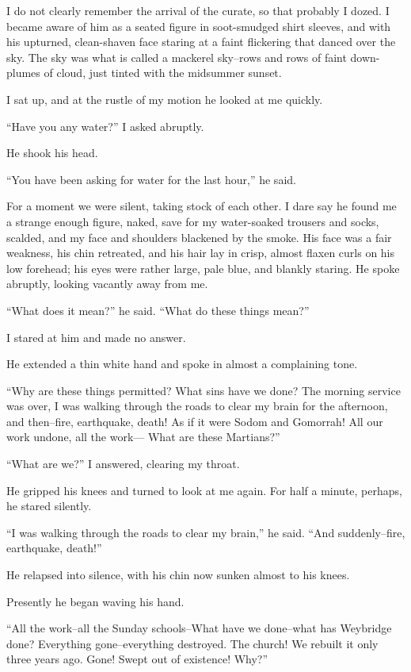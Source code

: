 I do not clearly remember the arrival of the curate, so that
probably I dozed. I became aware of him as a seated figure in
soot-smudged shirt sleeves, and with his upturned, clean-shaven
face staring at a faint flickering that danced over the sky. The
sky was what is called a mackerel sky--rows and rows of faint
down-plumes of cloud, just tinted with the midsummer sunset.

I sat up, and at the rustle of my motion he looked at me quickly.

``Have you any water?'' I asked abruptly.

He shook his head.

``You have been asking for water for the last hour,'' he said.

For a moment we were silent, taking stock of each other. I dare say
he found me a strange enough figure, naked, save for my
water-soaked trousers and socks, scalded, and my face and shoulders
blackened by the smoke. His face was a fair weakness, his chin
retreated, and his hair lay in crisp, almost flaxen curls on his
low forehead; his eyes were rather large, pale blue, and blankly
staring. He spoke abruptly, looking vacantly away from me.

``What does it mean?'' he said. ``What do these things mean?''

I stared at him and made no answer.

He extended a thin white hand and spoke in almost a complaining
tone.

``Why are these things permitted? What sins have we done? The
morning service was over, I was walking through the roads to clear
my brain for the afternoon, and then--fire, earthquake, death! As
if it were Sodom and Gomorrah! All our work undone, all the
work--- What are these Martians?''

``What are we?'' I answered, clearing my throat.

He gripped his knees and turned to look at me again. For half a
minute, perhaps, he stared silently.

``I was walking through the roads to clear my brain,'' he said. ``And
suddenly--fire, earthquake, death!''

He relapsed into silence, with his chin now sunken almost to his
knees.

Presently he began waving his hand.

``All the work--all the Sunday schools--What have we done--what has
Weybridge done? Everything gone--everything destroyed. The church!
We rebuilt it only three years ago. Gone! Swept out of existence!
Why?''

